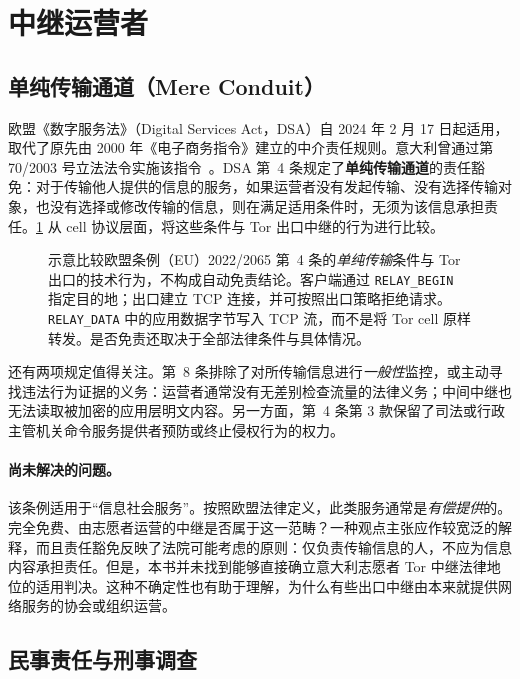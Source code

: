 \section{中继运营者}\label{sec:legale-relay}

\subsection{单纯传输通道（Mere Conduit）}

欧盟《数字服务法》（Digital Services Act，DSA）自 2024 年 2 月 17 日起适用，取代了原先由 2000 年《电子商务指令》建立的中介责任规则。意大利曾通过第 70/2003 号立法法令实施该指令~\cite{dsa2022}。DSA 第~4 条规定了\textbf{单纯传输通道}的责任豁免：对于传输他人提供的信息的服务，如果运营者没有发起传输、没有选择传输对象，也没有选择或修改传输的信息，则在满足适用条件时，无须为该信息承担责任。\cref{fig:conduit} 从 cell 协议层面，将这些条件与 Tor 出口中继的行为进行比较。

\begin{figure}[htbp]
\centering

\caption{示意比较欧盟条例（EU）2022/2065 第~4 条的\emph{单纯传输}条件与 Tor 出口的技术行为，不构成自动免责结论。客户端通过 \texttt{RELAY\_BEGIN} 指定目的地；出口建立 TCP 连接，并可按照出口策略拒绝请求。\texttt{RELAY\_DATA} 中的应用数据字节写入 TCP 流，而不是将 Tor cell 原样转发。是否免责还取决于全部法律条件与具体情况。}
\label{fig:conduit}
\end{figure}

还有两项规定值得关注。第~8 条排除了对所传输信息进行\emph{一般性}监控，或主动寻找违法行为证据的义务：运营者通常没有无差别检查流量的法律义务；中间中继也无法读取被加密的应用层明文内容。另一方面，第~4 条第 3 款保留了司法或行政主管机关命令服务提供者预防或终止侵权行为的权力。

\paragraph{尚未解决的问题。}该条例适用于\enquote{信息社会服务}。按照欧盟法律定义，此类服务通常是\emph{有偿提供}的。完全免费、由志愿者运营的中继是否属于这一范畴？一种观点主张应作较宽泛的解释，而且责任豁免反映了法院可能考虑的原则：仅负责传输信息的人，不应为信息内容承担责任。但是，本书并未找到能够直接确立意大利志愿者 Tor 中继法律地位的适用判决。这种不确定性也有助于理解，为什么有些出口中继由本来就提供网络服务的协会或组织运营。

\subsection{民事责任与刑事调查}

